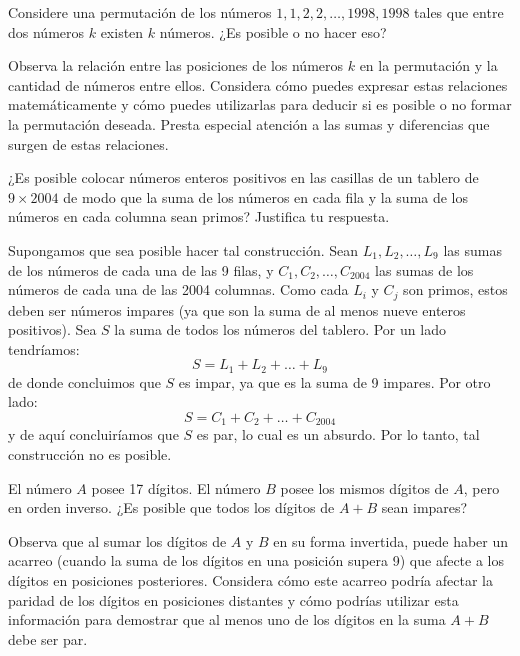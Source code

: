 \documentclass[11pt]{scrartcl}
\begin{document}
\begin{problem}[China 1986]
Considere una permutación de los números \(1,1,2,2,\ldots,1998,1998\) tales que entre dos números \(k\) existen \(k\) números. ¿Es posible o no hacer eso?
    \begin{hint}
    Observa la relación entre las posiciones de los números $k$ en la permutación y la cantidad de números entre ellos. Considera cómo puedes expresar estas relaciones matemáticamente y cómo puedes utilizarlas para deducir si es posible o no formar la permutación deseada. Presta especial atención a las sumas y diferencias que surgen de estas relaciones.
    \end{hint}
\end{problem}

\begin{problem}[Rusia 2004]
    ¿Es posible colocar números enteros positivos en las casillas de un tablero de $9 \times 2004$ de modo que la suma de los números en cada fila y la suma de los números en cada columna sean primos? Justifica tu respuesta.
    \begin{hint}
        Supongamos que sea posible hacer tal construcción. Sean $L_1, L_2, \ldots, L_9$ las sumas de los números de cada una de las 9 filas, y $C_1, C_2, \ldots, C_{2004}$ las sumas de los números de cada una de las 2004 columnas. Como cada $L_i$ y $C_j$ son primos, estos deben ser números impares (ya que son la suma de al menos nueve enteros positivos). Sea $S$ la suma de todos los números del tablero. Por un lado tendríamos:
$$
S = L_1 + L_2 + \ldots + L_9
$$
de donde concluimos que $S$ es impar, ya que es la suma de 9 impares. Por otro lado:
$$
S = C_1 + C_2 + \ldots + C_{2004}
$$
y de aquí concluiríamos que $S$ es par, lo cual es un absurdo. Por lo tanto, tal construcción no es posible.
    \end{hint}
\end{problem}

\begin{problem}
El número \(A\) posee 17 dígitos. El número \(B\) posee los mismos dígitos de \(A\), pero en orden inverso. ¿Es posible que todos los dígitos de \(A+B\) sean impares?
\begin{hint}
    Observa que al sumar los dígitos de \(A\) y \(B\) en su forma invertida, puede haber un acarreo (cuando la suma de los dígitos en una posición supera 9) que afecte a los dígitos en posiciones posteriores. Considera cómo este acarreo podría afectar la paridad de los dígitos en posiciones distantes y cómo podrías utilizar esta información para demostrar que al menos uno de los dígitos en la suma \(A + B\) debe ser par.
\end{hint}
\end{problem}
\end{document}

